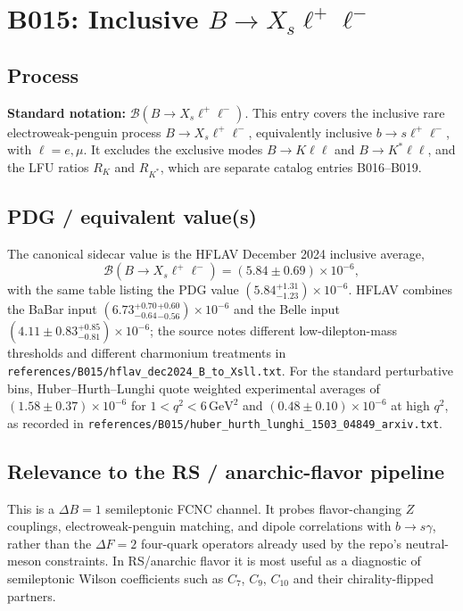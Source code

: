 
\section{B015: Inclusive \(B\to X_s\ell^+\ell^-\)}

\subsection*{Process}
\textbf{Standard notation:} \(\mathcal{B}(B\to X_s\ell^+\ell^-)\).
This entry covers the inclusive rare electroweak-penguin process
\(B\to X_s\ell^+\ell^-\), equivalently inclusive \(b\to s\ell^+\ell^-\),
with \(\ell=e,\mu\).  It excludes the exclusive modes \(B\to K\ell\ell\) and
\(B\to K^*\ell\ell\), and the LFU ratios \(R_K\) and \(R_{K^*}\), which are
separate catalog entries B016--B019.

\subsection*{PDG / equivalent value(s)}
The canonical sidecar value is the HFLAV December 2024 inclusive average,
\[
  \mathcal B(B\to X_s\ell^+\ell^-)=(5.84\pm0.69)\times10^{-6},
\]
with the same table listing the PDG value
\((5.84^{+1.31}_{-1.23})\times10^{-6}\).  HFLAV combines the BaBar input
\((6.73^{+0.70}_{-0.64}{}^{+0.60}_{-0.56})\times10^{-6}\) and the Belle input
\((4.11\pm0.83^{+0.85}_{-0.81})\times10^{-6}\); the source notes different
low-dilepton-mass thresholds and different charmonium treatments in
\texttt{references/B015/hflav\_dec2024\_B\_to\_Xsll.txt}.  For the standard
perturbative bins, Huber--Hurth--Lunghi quote weighted experimental averages
of \((1.58\pm0.37)\times10^{-6}\) for \(1<q^2<6\,\mathrm{GeV}^2\) and
\((0.48\pm0.10)\times10^{-6}\) at high \(q^2\), as recorded in
\texttt{references/B015/huber\_hurth\_lunghi\_1503\_04849\_arxiv.txt}.

\subsection*{Relevance to the RS / anarchic-flavor pipeline}
This is a \(\Delta B=1\) semileptonic FCNC channel.  It probes flavor-changing
\(Z\) couplings, electroweak-penguin matching, and dipole correlations with
\(b\to s\gamma\), rather than the \(\Delta F=2\) four-quark operators already
used by the repo's neutral-meson constraints.  In RS/anarchic flavor it is most
useful as a diagnostic of semileptonic Wilson coefficients such as \(C_7\),
\(C_9\), \(C_{10}\) and their chirality-flipped partners.

